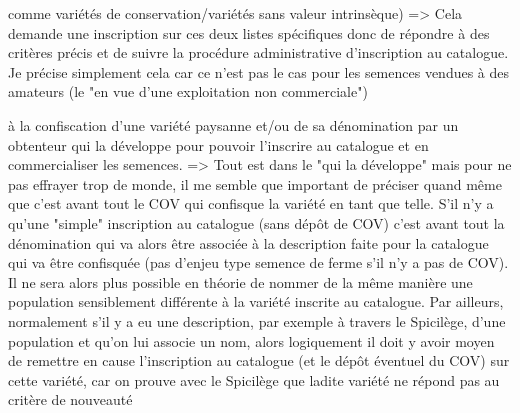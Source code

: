 



\newcommand{\versionFFb}{3}
\newcommand{\dateversionFFb}{8 mars 2017}

comme variétés de conservation/variétés sans valeur intrinsèque)
=> Cela demande une inscription sur ces deux listes spécifiques donc de répondre à des critères précis et de suivre la procédure administrative d'inscription au catalogue. Je précise simplement cela car ce n'est pas le cas pour les semences vendues à des amateurs (le "en vue d'une exploitation non commerciale")

à la confiscation d’une variété paysanne et/ou de sa dénomination par
un obtenteur qui la développe pour pouvoir l’inscrire au catalogue et
en commercialiser les semences.
=> Tout est dans le "qui la développe" mais pour ne pas effrayer trop de monde, il me semble que important de préciser quand même que c'est avant tout le COV qui confisque la variété en tant que telle. S'il n'y a qu'une "simple" inscription au catalogue (sans dépôt de COV) c'est avant tout la dénomination qui va alors être associée à la description faite pour la catalogue qui va être confisquée (pas d'enjeu type semence de ferme s'il n'y a pas de COV). Il ne sera alors plus possible en théorie de nommer de la même manière une population sensiblement différente à la variété inscrite au catalogue. Par ailleurs, normalement s'il y a eu une description, par exemple à travers le Spicilège, d'une population et qu'on lui associe un nom, alors logiquement il doit y avoir moyen de remettre en cause l'inscription au catalogue (et le dépôt éventuel du COV) sur cette variété, car on prouve avec le Spicilège que ladite  variété ne répond pas au critère de nouveauté

